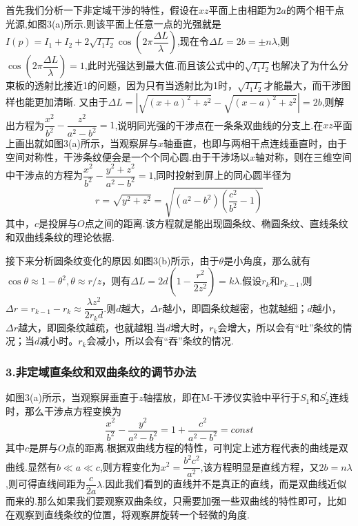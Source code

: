\documentclass[12pt,a4paper,UTF8]{ctexart}
\begin{document}
	首先我们分析一下非定域干涉的特性，假设在$xz$平面上由相距为$2a$的两个相干点光源,如图3(a)所示.则该平面上任意一点的光强就是$I(p)=I_1+I_2+2\sqrt{I_1I_2}\cos(2\pi\dfrac{\Delta L}{\lambda})$,现在令$\Delta L=2b=\pm n\lambda$,则$\cos(2\pi\dfrac{\Delta L}{\lambda})=1$,此时光强达到最大值.而且该公式中的$\sqrt{I_1I_2}$也解决了为什么分束板的透射比接近1的问题，因为只有当透射比为1时，$\sqrt{I_1I_2}$才能最大，而干涉图样也能更加清晰. 又由于$\Delta L=|\sqrt{(x+a)^2+z^2}-\sqrt{(x-a)^2+z^2}|=2b$,则解出方程为$\dfrac{x^2}{b^2}-\dfrac{z^2}{a^2-b^2}=1$,说明同光强的干涉点在一条条双曲线的分支上.在$xz$平面上画出就如图3(a)所示，当观察屏与$x$轴垂直，也即与两相干点连线垂直时，由于空间对称性，干涉条纹便会是一个个同心圆.由于干涉场以$x$轴对称，则在三维空间中干涉点的方程为$\dfrac{x^2}{b^2}-\dfrac{y^2+z^2}{a^2-b^2}=1$,同时投射到屏上的同心圆半径为
	$$
	r=\sqrt{y^2+z^2}=\sqrt{(a^2-b^2)(\frac{c^2}{b^2}-1)}
	$$
	其中，$c$是投屏与$O$点之间的距离.该方程就是能出现圆条纹、椭圆条纹、直线条纹和双曲线条纹的理论依据.\par
	接下来分析圆条纹变化的原因.如图3(b)所示，由于$\theta$是小角度，那么就有$\cos\theta\approx1-\theta^2,\theta\approx r/z$，则有$\Delta L=2d(1-\dfrac{r^2}{2z^2})=k\lambda$.假设$r_k$和$r_{k-1}$,则$\Delta r=r_{k-1}-r_k\approx \dfrac{\lambda z^2}{2r_kd}$.则$d$越大，$\Delta r$越小，即圆条纹越密，也就越细；$d$越小，$\Delta r$越大，即圆条纹越疏，也就越粗.当$d$增大时，$r_k$会增大，所以会有“吐”条纹的情况；当$d$减小时。$r_k$会减小，所以会有“吞”条纹的情况.
\subsubsection*{3.非定域直条纹和双曲条纹的调节办法}
	如图3(a)所示，当观察屏垂直于$z$轴摆放，即在M-干涉仪实验中平行于$S_1$和$S_2^{\prime}$连线时，那么干涉点方程变换为
	$$
	\frac{x^2}{b^2}-\frac{y^2}{a^2-b^2}=1+\frac{c^2}{a^2-b^2}=const
	$$
	其中$c$是屏与$O$点的距离.根据双曲线方程的特性，可判定上述方程代表的曲线是双曲线.显然有$b \ll a \ll c$,则方程变化为$x^2=\dfrac{b^2c^2}{a^2}$,该方程明显是直线方程，又$2b=n\lambda$,则可得直线间距为$\dfrac{c}{2a}\lambda$.因此我们看到的直线并不是真正的直线，而是双曲线近似而来的.那么如果我们要观察双曲条纹，只需要加强一些双曲线的特性即可，比如在观察到直线条纹的位置，将观察屏旋转一个轻微的角度.
\end{document}

